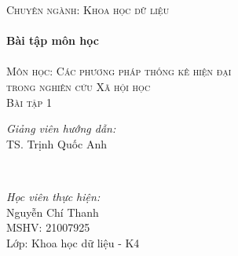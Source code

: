 \documentclass[14pt, a4paper]{article}
\theoremstyle{sltheorem}
\theoremstyle{soltheorem}
\begin{document}
\begin{titlepage}
    \textsc{\Large Chuyên ngành: Khoa học dữ liệu}\\[0.5cm] %



    \HRule \\[0.4cm]
    { \huge \bfseries Bài tập môn học}\\[0.4cm] %
    \HRule \\[1.5cm]

    \textsc{\Large Môn học: Các phương pháp thống kê hiện đại \\ trong nghiên cứu Xã hội học}\\[1cm] %


    \textsc{\Large Bài tập 1}\\[1cm]


    \begin{minipage}{0.4\textwidth}
        \begin{flushleft} \large
        \emph{Giảng viên hướng dẫn:} \\
        TS. Trịnh Quốc Anh %
        \end{flushleft}
    \end{minipage}\\[0.5cm]

    \begin{minipage}{0.4\textwidth}
    \begin{flushleft} \large
    \emph{Học viên thực hiện:}\\
    Nguyễn Chí Thanh \\
    MSHV: 21007925 \\ %
    Lớp: Khoa học dữ liệu - K4
    \end{flushleft}
    \end{minipage}




\end{titlepage}
\end{document}
